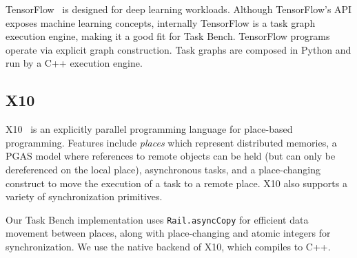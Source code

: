TensorFlow~\cite{TensorFlow15} is designed for deep learning
workloads. Although TensorFlow's API exposes machine learning
concepts, internally TensorFlow is a task graph execution engine,
making it a good fit for Task Bench. TensorFlow programs operate via
explicit graph construction. Task graphs are composed in Python and
run by a C++ execution engine.

\subsection{X10}

X10~\cite{X1005} is an explicitly parallel programming language for
place-based programming. Features include \emph{places}
which represent distributed memories, a PGAS model where references to
remote objects can be held (but can only be dereferenced on the local
place), asynchronous tasks, and a place-changing construct to move the
execution of a task to a remote place. X10 also supports a variety of
synchronization primitives.

Our Task Bench implementation uses
\lstinline[language=X10]{Rail.asyncCopy} for efficient data movement
between places, along with place-changing and atomic integers for
synchronization. We use the native backend of X10, which compiles to
C++.
